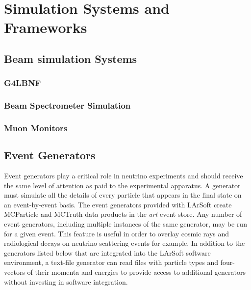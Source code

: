 %
\chapter{Simulation Systems and Frameworks}  %
\section{Beam simulation Systems}

\subsection{G4LBNF}

\subsection{Beam Spectrometer Simulation}

\subsection{Muon Monitors}

\section{Event Generators}

Event generators play a critical role in neutrino experiments and should receive the 
same level of attention as paid to the experimental apparatus. 
A generator must simulate all the details of every particle that appears in the final state on an event-by-event basis.
The event generators provided with LArSoft create MCParticle and MCTruth data products in
the {\it{art}} event store.  Any number of event generators, including multiple instances of the
same generator, may be run for a given event.  This feature is useful in order to overlay cosmic
rays and radiological decays on neutrino scattering events for example.  In addition to the
generators listed below that are integrated into the LArSoft software environment, a text-file generator
can read files with particle types and four-vectors of their momenta and energies to provide access
to additional generators without investing in software integration.

